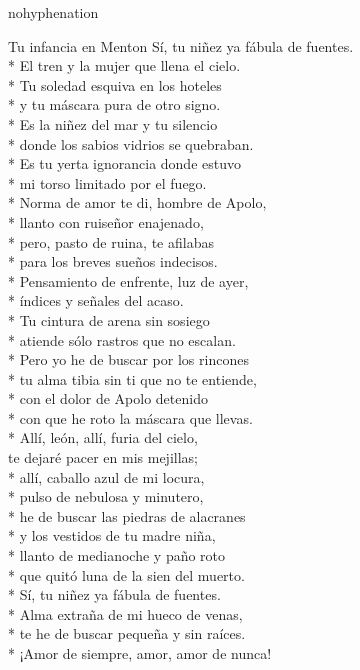 \documentclass[
    a5paper,
    DIV=10,
    12pt,
    notitlepage,
    oneside,]
{scrbook} %
\begin{document}
\begin{hyphenrules}{nohyphenation}
\begin{poem}{Tu infancia en Menton}{}{}
Sí, tu niñez ya fábula de fuentes.\\*
El tren y la mujer que llena el cielo.\\*
Tu soledad esquiva en los hoteles\\*
y tu máscara pura de otro signo.\\*
Es la niñez del mar y tu silencio\\*
donde los sabios vidrios se quebraban.\\*
Es tu yerta ignorancia donde estuvo\\*
mi torso limitado por el fuego.\\*
Norma de amor te di, hombre de Apolo,\\*
llanto con ruiseñor enajenado,\\*
pero, pasto de ruina, te afilabas\\*
para los breves sueños indecisos.\\*
Pensamiento de enfrente, luz de ayer,\\*
índices y señales del acaso.\\*
Tu cintura de arena sin sosiego\\*
atiende sólo rastros que no escalan.\\*
Pero yo he de buscar por los rincones\\*
tu alma tibia sin ti que no te entiende,\\*
con el dolor de Apolo detenido\\*
con que he roto la máscara que llevas.\\*
Allí, león, allí, furia del cielo,\\

te dejaré pacer en mis mejillas;\\*
allí, caballo azul de mi locura,\\*
pulso de nebulosa y minutero,\\*
he de buscar las piedras de alacranes\\*
y los vestidos de tu madre niña,\\*
llanto de medianoche y paño roto\\*
que quitó luna de la sien del muerto.\\*
Sí, tu niñez ya fábula de fuentes.\\*
Alma extraña de mi hueco de venas,\\*
te he de buscar pequeña y sin raíces.\\*
¡Amor de siempre, amor, amor de nunca!\\


\end{poem}
\end{hyphenrules}
\end{document}
